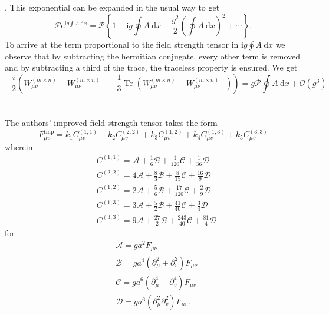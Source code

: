 \documentclass[a4paper,10pt]{book}
\begin{document}
\cite{BILSONTHOMPSON20031}. This exponential can be expanded in the usual way to get 
\begin{equation}
\mathscr{P} \mathrm{e}^{\mathrm{i} g \oint A \mathrm{~d} x}=\mathscr{P}\left\{1+\mathrm{i} g \oint A \mathrm{~d} x-\frac{g^{2}}{2}(\oint A \mathrm{~d} x)^{2}+\cdots\right\}.
\end{equation}
To arrive at the term proportional to the field strength tensor in $\mathrm{i} g \oint A \mathrm{~d} x$ we observe that by subtracting the hermitian conjugate, every other term is removed and by subtracting a third of the trace, the traceless property is ensured. We get
\begin{equation}\label{eq:cloverToFST}
-\frac{i}{2}\left( W_{\mu \nu}^{(m \times n)}- W_{\mu \nu}^{(m \times n)\dagger} - \frac{1}{3}\operatorname{Tr}\left( W_{\mu \nu}^{(m \times n)}- W_{\mu \nu}^{(m \times n)\dagger} \right)  \right) = g \mathscr{P} \oint A \mathrm{~d} x+\mathcal{O}\left(g^{3}\right)
\end{equation}
\\\\The authors' improved field strength tensor takes the form 
\begin{equation}\label{eq:Improved_lattice_field_strength_tensor}
F_{\mu v}^{\operatorname{Imp}}=k_{1} C_{\mu v}^{(1,1)}+k_{2} C_{\mu v}^{(2,2)}+k_{3} C_{\mu v}^{(1,2)}+k_{4} C_{\mu v}^{(1,3)}+k_{5} C_{\mu v}^{(3,3)}
\end{equation}
wherein 
\begin{equation}
\begin{aligned}
&C^{(1,1)}=\mathscr{A}+\frac{1}{6} \mathscr{B}+\frac{1}{120} \mathscr{C}+\frac{1}{36} \mathscr{D} \\
&C^{(2,2)}=4 \mathscr{A}+\frac{8}{3} \mathscr{B}+\frac{8}{15} \mathscr{C}+\frac{16}{9} \mathscr{D} \\
&C^{(1,2)}=2 \mathscr{A}+\frac{5}{6} \mathscr{B}+\frac{17}{120} \mathscr{C}+\frac{2}{9} \mathscr{D} \\
&C^{(1,3)}=3 \mathscr{A}+\frac{5}{2} \mathscr{B}+\frac{41}{40} \mathscr{C}+\frac{3}{4} \mathscr{D} \\
&C^{(3,3)}=9 \mathscr{A}+\frac{27}{2} \mathscr{B}+\frac{243}{40} \mathscr{C}+\frac{81}{4} \mathscr{D}
\end{aligned}
\end{equation}
for 
\begin{equation}
\begin{aligned}
&\mathscr{A}=g a^{2} F_{\mu \nu} \\
&\mathscr{B}=g a^{4}\left(\partial_{\mu}^{2}+\partial_{v}^{2}\right) F_{\mu \nu} \\
&\mathscr{C}=g a^{6}\left(\partial_{\mu}^{4}+\partial_{v}^{4}\right) F_{\mu v} \\
&\mathscr{D}=g a^{6}\left(\partial_{\mu}^{2} \partial_{v}^{2}\right) F_{\mu v}.
\end{aligned}
\end{equation}
\end{document}
